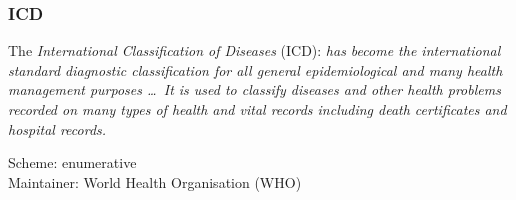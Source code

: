 %
%
%
%
%
%
%

\subsubsection{ICD}
\label{icd_heading}

The \emph{International Classification of Diseases} (ICD): \textit{has become
the international standard diagnostic classification for all general
epidemiological and many health management purposes \ldots\ It is used to
classify diseases and other health problems recorded on many types of health
and vital records including death certificates and hospital records.} \cite{icd}

Scheme: enumerative\\
Maintainer: World Health Organisation (WHO)
